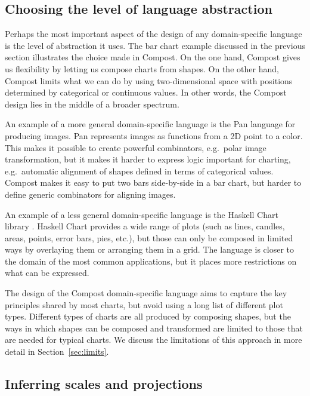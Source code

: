 \documentclass{jfp}
\begin{document}
\subsection{Choosing the level of language abstraction}
\label{sec:basic-level}

Perhaps the most important aspect of the design of any domain-specific language is the level
of abstraction it uses. The bar chart example discussed in the previous section illustrates
the choice made in Compost. On the one hand, Compost gives us flexibility by letting us
compose charts from shapes. On the other hand, Compost limits what we can do by using
two-dimensional space with positions determined by categorical or continuous values.
In other words, the Compost design lies in the middle of a broader spectrum.

An example of a more general domain-specific language is the Pan language \cite{fun} for producing
images. Pan represents images as functions from a 2D point to a color. This makes it possible to
create powerful combinators, e.g.~polar image transformation, but it makes it harder
to express logic important for charting, e.g.~automatic alignment of shapes defined in terms
of categorical values. Compost makes it easy to put two bars side-by-side in a
bar chart, but harder to define generic combinators for aligning images.

An example of a less general domain-specific language is the Haskell Chart library \cite{hcharts}.
Haskell Chart provides a wide range of plots (such as lines, candles, areas, points, error bars, pies, etc.),
but those can only be composed in limited ways by overlaying them or arranging them in a grid.
The language is closer to the domain of the most common applications, but it places more
restrictions on what can be expressed.

The design of the Compost domain-specific language aims to capture the key principles shared
by most charts, but avoid using a long list of different plot types. Different types of charts
are all produced by composing shapes, but the ways in which shapes can be composed and transformed
are limited to those that are needed for typical charts. We discuss the limitations of this
approach in more detail in Section~\ref{sec:limits}.

\subsection{Inferring scales and projections}
\label{sec:basic-scales}
\end{document}
